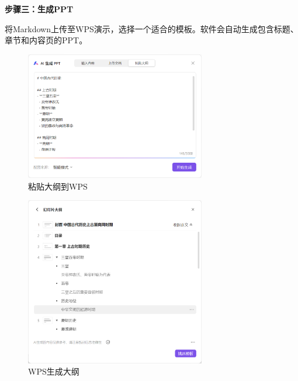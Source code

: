 \textbf{步骤三：生成PPT}

将Markdown上传至WPS演示，选择一个适合的模板。软件会自动生成包含标题、章节和内容页的PPT。

\centering
\begin{figure}[H] %
  \centering %
  \includegraphics[width=0.7\textwidth]{assets/figures/image-20250210192847219.png} %
  \caption{粘贴大纲到WPS} %
  \label{Fig.main1} %
\end{figure}%

\centering
\begin{figure}[H] %
  \centering %
  \includegraphics[width=0.7\textwidth]{assets/figures/image-20250210192936323.png} %
  \caption{WPS生成大纲} %
  \label{Fig.main1} %
\end{figure}%

